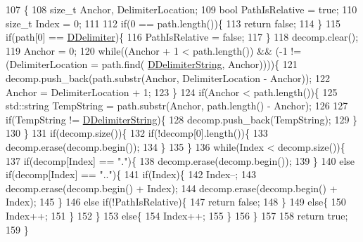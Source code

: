 \begin{DoxyCode}
107                                                                               \{
108     \textcolor{keywordtype}{size\_t} Anchor, DelimiterLocation;
109     \textcolor{keywordtype}{bool} PathIsRelative = \textcolor{keyword}{true};
110     \textcolor{keywordtype}{size\_t} Index = 0;
111     
112     \textcolor{keywordflow}{if}(0 == path.length())\{
113         \textcolor{keywordflow}{return} \textcolor{keyword}{false};
114     \}
115     \textcolor{keywordflow}{if}(path[0] == \hyperlink{classCPath_a4af2d74fc7695c4de8900dcc426530b5}{DDelimiter})\{
116         PathIsRelative = \textcolor{keyword}{false};   
117     \}
118     decomp.clear();
119     Anchor = 0;
120     \textcolor{keywordflow}{while}((Anchor + 1 < path.length()) && (-1 != (DelimiterLocation = path.find(
      \hyperlink{classCPath_a88b8652d01ff3359a48dd75126cc5776}{DDelimiterString}, Anchor))))\{
121         decomp.push\_back(path.substr(Anchor, DelimiterLocation - Anchor));
122         Anchor = DelimiterLocation + 1;
123     \}
124     \textcolor{keywordflow}{if}(Anchor < path.length())\{
125         std::string TempString = path.substr(Anchor, path.length() - Anchor);
126 
127         \textcolor{keywordflow}{if}(TempString != \hyperlink{classCPath_a88b8652d01ff3359a48dd75126cc5776}{DDelimiterString})\{
128             decomp.push\_back(TempString);
129         \}
130     \}
131     \textcolor{keywordflow}{if}(decomp.size())\{
132         \textcolor{keywordflow}{if}(!decomp[0].length())\{
133             decomp.erase(decomp.begin());
134         \}
135     \}
136     \textcolor{keywordflow}{while}(Index  < decomp.size())\{
137         \textcolor{keywordflow}{if}(decomp[Index] == \textcolor{stringliteral}{"."})\{
138             decomp.erase(decomp.begin());
139         \}
140         \textcolor{keywordflow}{else} \textcolor{keywordflow}{if}(decomp[Index] == \textcolor{stringliteral}{".."})\{
141             \textcolor{keywordflow}{if}(Index)\{
142                 Index--;
143                 decomp.erase(decomp.begin() + Index);
144                 decomp.erase(decomp.begin() + Index);
145             \}
146             \textcolor{keywordflow}{else} \textcolor{keywordflow}{if}(!PathIsRelative)\{
147                 \textcolor{keywordflow}{return} \textcolor{keyword}{false};
148             \}
149             \textcolor{keywordflow}{else}\{
150                 Index++;
151             \}
152         \}
153         \textcolor{keywordflow}{else}\{
154             Index++;
155         \}
156     \}    
157     
158     \textcolor{keywordflow}{return} \textcolor{keyword}{true};
159 \}
\end{DoxyCode}
